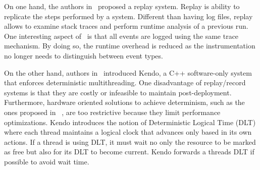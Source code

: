 On one hand, the authors
in~\cite{replayDeterminism} proposed a replay system.
Replay is ability to replicate the steps performed by a system.
Different than having log files, replay allows to examine
stack traces and perform runtime analysis of a previous run.
One interesting aspect of~\cite{replayDeterminism} is that all
events are logged using the same trace mechanism. By doing so,
the runtime overhead is reduced as the instrumentation no longer
needs to distinguish between event types.

On the other hand, authors in~\cite{kendoEfficientDeterministicMultithreading}
introduced Kendo, a C++ software-only system that enforces
deterministic multithreading. One disadvantage
of replay/record systems is that they are costly or infeasible
to maintain post-deployment. Furthermore,
hardware oriented solutions to achieve determinism,
such as the ones proposed in ~\cite{hardwareDeterminism},
are too restrictive because they limit performance
optimizations. Kendo introduces the notion of Deterministic
Logical Time (DLT) where each thread maintains a logical
clock that advances only based in its own actions.
If a thread is using DLT, it must wait no only
the resource to be marked as free but also for its
DLT to become current. Kendo forwards a threads DLT
if possible to avoid wait time.